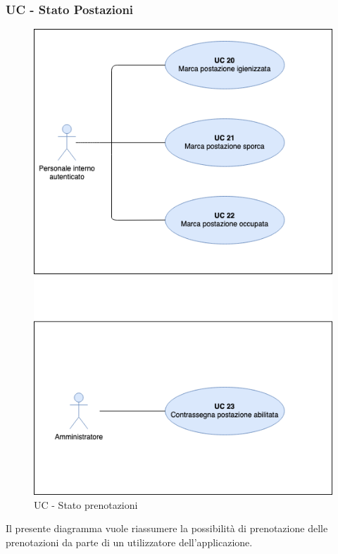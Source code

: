 \subsubsection{UC - Stato Postazioni}

\begin{figure}[h]
  \centering
    \includegraphics[scale=0.5]{src/CasiDUso/Immagini/UC-statoPostazioni.png}
  \caption{UC  - Stato prenotazioni}
\end{figure}

Il presente diagramma vuole riassumere la possibilità di prenotazione delle prenotazioni da parte di un utilizzatore dell’applicazione.

